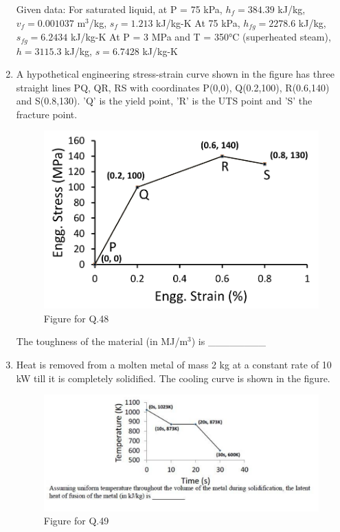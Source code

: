 \documentclass[journal,11pt,onecolumn]{IEEEtran}
\begin{document}
\begin{enumerate}[resume]
          Given data:
          For saturated liquid, at P = 75 kPa,
          $h_f = 384.39$ kJ/kg, $v_f = 0.001037$ m$^3$/kg, $s_f = 1.213$ kJ/kg-K
          At 75 kPa, $h_{fg} = 2278.6$ kJ/kg, $s_{fg} = 6.2434$ kJ/kg-K
          At P = 3 MPa and T = 350°C (superheated steam),
          $h = 3115.3$ kJ/kg, $s = 6.7428$ kJ/kg-K

    \item A hypothetical engineering stress-strain curve shown in the figure has three straight lines PQ, QR, RS with coordinates P(0,0), Q(0.2,100), R(0.6,140) and S(0.8,130). 'Q' is the yield point, 'R' is the UTS point and 'S' the fracture point.

          \begin{figure}[H]
              \centering
              \includegraphics[scale=0.3]{q48}
              \caption{Figure for Q.48}
              \label{q48}
          \end{figure}

          The toughness of the material (in MJ/m$^3$) is \_\_\_\_\_\_\_\_

    \item Heat is removed from a molten metal of mass 2 kg at a constant rate of 10 kW till it is completely solidified. The cooling curve is shown in the figure.
          \begin{figure}[H]
              \centering
              \includegraphics[scale=0.23]{q49}
              \caption{Figure for Q.49}
              \label{q49}
          \end{figure}


\end{enumerate}
\end{document}
